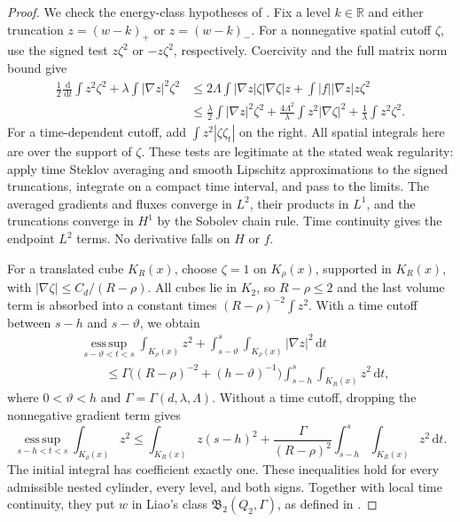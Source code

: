 \documentclass[11pt]{article}
\newcommand{\R}{\mathbb R}
\newcommand{\esssup}{\operatorname*{ess\,sup}}
\newcommand{\dd}{\,\mathrm d}
\begin{document}
\begin{proof}
We check the energy-class hypotheses of \cite[Section 1.1]{Liao}.
Fix a level $k\in\R$ and either truncation $z=(w-k)_+$ or $z=(w-k)_-$.
For a nonnegative spatial cutoff $\zeta$, use the signed test
$z\zeta^2$ or $-z\zeta^2$, respectively. Coercivity and the full matrix
norm bound give
\begin{align*}
 \frac12\frac{\dd}{\dd t}\int z^2\zeta^2
 +\lambda\int|\nabla z|^2\zeta^2
 &\le2\Lambda\int |\nabla z|\zeta|\nabla\zeta|z
       +\int |f||\nabla z|z\zeta^2\\
 &\le\frac\lambda2\int|\nabla z|^2\zeta^2
       +\frac{4\Lambda^2}{\lambda}\int z^2|\nabla\zeta|^2
       +\frac1\lambda\int z^2\zeta^2.
\end{align*}
For a time-dependent cutoff, add $\int z^2|\zeta\zeta_t|$ on the right.
All spatial integrals here are over the support of $\zeta$.
These tests are legitimate at the stated weak regularity: apply time
Steklov averaging and smooth Lipschitz approximations to the signed
truncations, integrate on a compact time interval, and pass to the limits.
The averaged gradients and fluxes converge in $L^2$, their products in
$L^1$, and the truncations converge in $H^1$ by the Sobolev chain rule.
Time continuity gives the endpoint $L^2$ terms. No derivative falls on
$H$ or $f$.

For a translated cube $K_R(x)$, choose $\zeta=1$ on $K_\rho(x)$,
supported in $K_R(x)$, with $|\nabla\zeta|\le C_d/(R-\rho)$.
All cubes lie in $K_2$, so $R-\rho\le2$ and the last volume term is
absorbed into a constant times $(R-\rho)^{-2}\int z^2$.
With a time cutoff between $s-h$ and $s-\vartheta$, we obtain
\begin{align}\label{eq:DG1}
 &\esssup_{s-\vartheta<t<s}\int_{K_\rho(x)}z^2
  +\int_{s-\vartheta}^s\int_{K_\rho(x)}|\nabla z|^2\dd t\nonumber\\
 &\qquad\le\Gamma\bigl((R-\rho)^{-2}+(h-\vartheta)^{-1}\bigr)
       \int_{s-h}^s\int_{K_R(x)}z^2\dd t,
\end{align}
where $0<\vartheta<h$ and $\Gamma=\Gamma(d,\lambda,\Lambda)$.
Without a time cutoff, dropping the nonnegative gradient term gives
\begin{equation}\label{eq:DG2}
 \esssup_{s-h<t<s}\int_{K_\rho(x)}z^2
 \le\int_{K_R(x)}z(s-h)^2
  +\frac{\Gamma}{(R-\rho)^2}
       \int_{s-h}^s\int_{K_R(x)}z^2\dd t.
\end{equation}
The initial integral has coefficient exactly one. These inequalities hold
for every admissible nested cylinder, every level, and both signs. Together
with local time continuity, they put $w$ in Liao's class
$\mathfrak B_2(Q_2,\Gamma)$, as defined in
\cite[equations (1.1)--(1.2)]{Liao}.


\end{proof}
\end{document}
